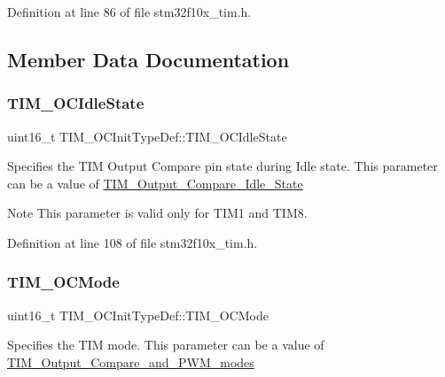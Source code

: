Definition at line 86 of file stm32f10x\+\_\+tim.\+h.



\subsection{Member Data Documentation}
\mbox{\label{struct_t_i_m___o_c_init_type_def_a2a28f2d62339e06caef12816e04a8f55}} 
\subsubsection{\texorpdfstring{T\+I\+M\+\_\+\+O\+C\+Idle\+State}{TIM\_OCIdleState}}
{\footnotesize\ttfamily uint16\+\_\+t T\+I\+M\+\_\+\+O\+C\+Init\+Type\+Def\+::\+T\+I\+M\+\_\+\+O\+C\+Idle\+State}

Specifies the T\+IM Output Compare pin state during Idle state. This parameter can be a value of \hyperlink{group___t_i_m___output___compare___idle___state}{T\+I\+M\+\_\+\+Output\+\_\+\+Compare\+\_\+\+Idle\+\_\+\+State} \begin{DoxyNote}{Note}
This parameter is valid only for T\+I\+M1 and T\+I\+M8. 
\end{DoxyNote}


Definition at line 108 of file stm32f10x\+\_\+tim.\+h.

\mbox{\label{struct_t_i_m___o_c_init_type_def_ad4338ed2415b0d6d19589bf72b7ba3b0}} 
\subsubsection{\texorpdfstring{T\+I\+M\+\_\+\+O\+C\+Mode}{TIM\_OCMode}}
{\footnotesize\ttfamily uint16\+\_\+t T\+I\+M\+\_\+\+O\+C\+Init\+Type\+Def\+::\+T\+I\+M\+\_\+\+O\+C\+Mode}

Specifies the T\+IM mode. This parameter can be a value of \hyperlink{group___t_i_m___output___compare__and___p_w_m__modes}{T\+I\+M\+\_\+\+Output\+\_\+\+Compare\+\_\+and\+\_\+\+P\+W\+M\+\_\+modes} 

